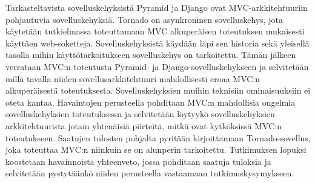 \documentclass[utf8]{gradu3}
\begin{document}
Tarkasteltavista sovelluskehyksistä Pyramid ja Django ovat MVC-arkkitehtuuriin pohjautuvia sovelluskehyksiä. Tornado on asynkroninen sovelluskehys, jota käytetään tutkielmassa toteuttamaan MVC alkuperäisen toteutuksen mukaisesti käyttäen web-soketteja. Sovelluskehyksistä käydään läpi sen 
historia sekä yleisellä tasolla mihin käyttötarkoitukseen
sovelluskehys on tarkoitettu. Tämän jälkeen verrataan MVC:n toteutusta 
Pyramid- ja Django-sovelluskehykseen ja selvitetään millä tavalla niiden sovellusarkkitehtuuri mahdollisesti eroaa MVC:n alkuperäisestä toteutuksesta. Sovelluskehyksien muihin teknisiin ominaisuuksiin ei oteta kantaa.
Havaintojen perusteella pohditaan MVC:n mahdollisia ongelmia sovelluskehyksien toteutuksessa 
ja selvitetään löytyykö sovelluskehyksien arkkitehtuurista jotain yhtenäisiä piirteitä, mitkä ovat
kytköksissä MVC:n toteutukseen. Saatujen tulosten pohjalta  pyritään kirjoittamaan Tornado-sovellus, joka toteuttaa MVC:n 
niinkuin se on alunperin tarkoitettu. Tutkimuksen lopuksi koostetaan havainnoista yhteenveto, jossa pohditaan saatuja tuloksia ja selvitetään 
pystytäänkö niiden perusteella vastaamaan tutkimuskysymykseen.
\end{document}
